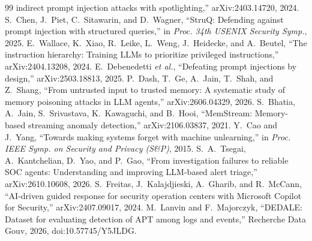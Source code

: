 \documentclass[conference]{IEEEtran}
\begin{document}
\begin{thebibliography}{99}
indirect prompt injection attacks with spotlighting,'' arXiv:2403.14720, 2024.
 S.~Chen, J.~Piet, C.~Sitawarin, and D.~Wagner, ``StruQ: Defending against prompt injection with
structured queries,'' in \emph{Proc. 34th USENIX Security Symp.}, 2025.
 E.~Wallace, K.~Xiao, R.~Leike, L.~Weng, J.~Heidecke, and A.~Beutel, ``The instruction
hierarchy: Training LLMs to prioritize privileged instructions,'' arXiv:2404.13208, 2024.
 E.~Debenedetti \emph{et al.}, ``Defeating prompt injections by design,'' arXiv:2503.18813, 2025.
 P.~Dash, T.~Ge, A.~Jain, T.~Shah, and Z.~Shang, ``From untrusted input to trusted memory: A
systematic study of memory poisoning attacks in LLM agents,'' arXiv:2606.04329, 2026.
 S.~Bhatia, A.~Jain, S.~Srivastava, K.~Kawaguchi, and B.~Hooi, ``MemStream: Memory-based
streaming anomaly detection,'' arXiv:2106.03837, 2021.
 Y.~Cao and J.~Yang, ``Towards making systems forget with machine unlearning,'' in \emph{Proc.
IEEE Symp. on Security and Privacy (S\&P)}, 2015.
 S.~A.~Tsegai, A.~Kantchelian, D.~Yao, and P.~Gao, ``From investigation failures to reliable SOC
agents: Understanding and improving LLM-based alert triage,'' arXiv:2610.10608, 2026.
 S.~Freitas, J.~Kalajdjieski, A.~Gharib, and R.~McCann, ``AI-driven guided response for security
operation centers with Microsoft Copilot for Security,'' arXiv:2407.09017, 2024.
 M.~Lanvin and F.~Majorczyk, ``DEDALE: Dataset for evaluating detection of APT among logs and
events,'' Recherche Data Gouv, 2026, doi:10.57745/Y5JLDG.
\end{thebibliography}
\end{document}
